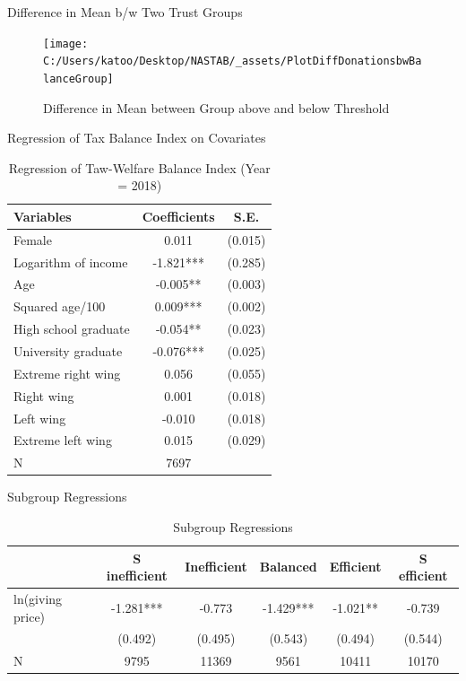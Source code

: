 \documentclass[
  ignorenonframetext,
]{beamer}
\begin{document}
\begin{frame}{Difference in Mean b/w Two Trust Groups}
\protect\hypertarget{difference-in-mean-bw-two-trust-groups-1}{}
\begin{figure}
\texttt{[image: C:/Users/katoo/Desktop/NASTAB/\_assets/PlotDiffDonationsbwBalanceGroup]} \caption{Difference in Mean between Group above and below Threshold}\label{fig:unnamed-chunk-10}
\end{figure}
\end{frame}

\begin{frame}{Regression of Tax Balance Index on Covariates}
\protect\hypertarget{regression-of-tax-balance-index-on-covariates}{}
\begin{table}

\caption{\label{tab:kableRegBalanceidOnCovariate}Regression of Taw-Welfare Balance Index (Year = 2018)}
\centering
\begin{tabular}[t]{lcc}
\toprule
Variables & Coefficients & S.E.\\
\midrule
Female & 0.011 & (0.015)\\
Logarithm of income & -1.821*** & (0.285)\\
Age & -0.005** & (0.003)\\
Squared age/100 & 0.009*** & (0.002)\\
High school graduate & -0.054** & (0.023)\\
University graduate & -0.076*** & (0.025)\\
Extreme right wing & 0.056 & (0.055)\\
Right wing & 0.001 & (0.018)\\
Left wing & -0.010 & (0.018)\\
Extreme left wing & 0.015 & (0.029)\\
N & 7697 & \\
\bottomrule
\end{tabular}
\end{table}
\end{frame}

\begin{frame}{Subgroup Regressions}
\protect\hypertarget{subgroup-regressions-1}{}
\begin{table}

\caption{\label{tab:kableEstimateElasticityByBalanceGroup}Subgroup Regressions}
\centering
\fontsize{8}{10}\selectfont
\begin{tabular}[t]{lccccc}
\toprule
 & S inefficient & Inefficient & Balanced & Efficient & S efficient\\
\midrule
ln(giving price) & -1.281*** & -0.773 & -1.429*** & -1.021** & -0.739\\
 & (0.492) & (0.495) & (0.543) & (0.494) & (0.544)\\
N & 9795 & 11369 & 9561 & 10411 & 10170\\
\bottomrule
\end{tabular}
\end{table}
\end{frame}
\end{document}
